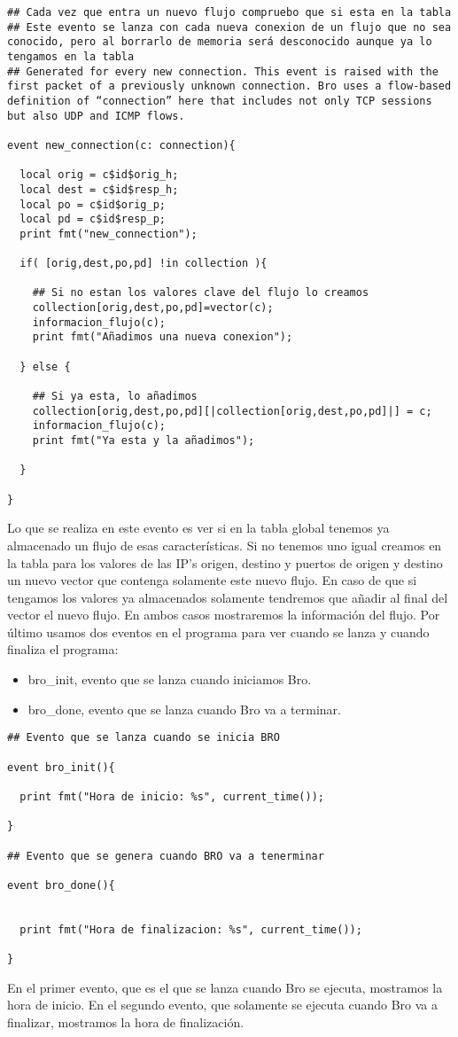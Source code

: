 \begin{lstlisting}[style=CodigoC]
## Cada vez que entra un nuevo flujo compruebo que si esta en la tabla
## Este evento se lanza con cada nueva conexion de un flujo que no sea conocido, pero al borrarlo de memoria será desconocido aunque ya lo tengamos en la tabla
## Generated for every new connection. This event is raised with the first packet of a previously unknown connection. Bro uses a flow-based definition of “connection” here that includes not only TCP sessions but also UDP and ICMP flows.

event new_connection(c: connection){

  local orig = c$id$orig_h;
  local dest = c$id$resp_h;
  local po = c$id$orig_p;
  local pd = c$id$resp_p;
  print fmt("new_connection");
 
  if( [orig,dest,po,pd] !in collection ){

    ## Si no estan los valores clave del flujo lo creamos
    collection[orig,dest,po,pd]=vector(c);
    informacion_flujo(c);
    print fmt("Añadimos una nueva conexion");
  
  } else {

    ## Si ya esta, lo añadimos
    collection[orig,dest,po,pd][|collection[orig,dest,po,pd]|] = c;
    informacion_flujo(c);
    print fmt("Ya esta y la añadimos");
 
  }

}
\end{lstlisting}

\noindent Lo que se realiza en este evento es ver si en la tabla global tenemos 
ya almacenado un flujo de esas características. Si no tenemos uno igual 
creamos en la tabla para los valores de las IP's origen, destino y puertos 
de origen y destino un nuevo vector que contenga solamente este nuevo flujo. 
En caso de que si tengamos los valores ya almacenados solamente tendremos que 
añadir al final del vector el nuevo flujo. En ambos casos mostraremos la 
información del flujo.
\intro
Por último usamos dos eventos en el programa para ver cuando se 
lanza y cuando finaliza el programa:
\intro
\begin{itemize}
\item bro\_init, evento que se lanza cuando iniciamos Bro.
\item bro\_done, evento que se lanza cuando Bro va a terminar.
\end{itemize}
\intro
\begin{lstlisting}[style=CodigoC]
## Evento que se lanza cuando se inicia BRO

event bro_init(){

  print fmt("Hora de inicio: %s", current_time());

}

## Evento que se genera cuando BRO va a tenerminar

event bro_done(){

 
  print fmt("Hora de finalizacion: %s", current_time());

}
\end{lstlisting}

\noindent En el primer evento, que es el que se lanza cuando Bro se ejecuta, 
mostramos la hora de inicio. En el segundo evento, que solamente 
se ejecuta cuando Bro va a finalizar, mostramos la hora de finalización.
